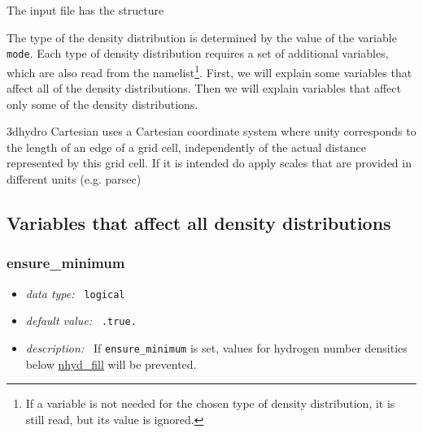 \documentclass[a4paper,10pt]{article}
\begin{document}
\begin{appendix}
The input file has the structure
\begin{center}
\end{center}

The type of the density distribution is determined by the value
of the variable \texttt{mode}. Each type of density distribution requires a set 
of additional variables, which are also read from the namelist\footnote{If a 
variable is not needed for the chosen type of density distribution, it is still 
read, but its value is ignored.}.  First, we will explain some variables 
that affect all of the density distributions. Then we will explain variables 
that affect only some of the density distributions. 

3dhydro Cartesian uses a Cartesian coordinate system where unity corresponds to 
the length of an edge of a grid cell, independently of the actual distance 
represented by this grid cell. If it is intended do apply scales that are 
provided in different units (e.g. parsec)

\subsection{Variables that affect all density distributions}

\subsubsection{ensure\_minimum}
\label{hydoptnl:ensureminimum}
\begin{itemize}
 \item \textit{data type:~} \texttt{logical}
 \item \textit{default value:~} \texttt{.true.}
 \item \textit{description:~} If \texttt{ensure\_minimum} is set, values for 
  hydrogen number densities below
  \hyperref[hydopt:nhydfill]{nhyd\_fill} will be prevented.
\end{itemize}


\end{appendix}
\end{document}
